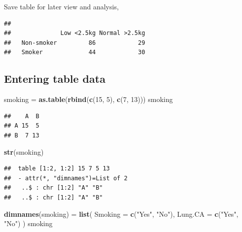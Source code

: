 \documentclass[]{book}
\newenvironment{Shaded}{\begin{snugshade}}{\end{snugshade}}
\newcommand{\KeywordTok}[1]{\textcolor[rgb]{0.13,0.29,0.53}{\textbf{#1}}}
\newcommand{\DataTypeTok}[1]{\textcolor[rgb]{0.13,0.29,0.53}{#1}}
\newcommand{\DecValTok}[1]{\textcolor[rgb]{0.00,0.00,0.81}{#1}}
\newcommand{\StringTok}[1]{\textcolor[rgb]{0.31,0.60,0.02}{#1}}
\newcommand{\OperatorTok}[1]{\textcolor[rgb]{0.81,0.36,0.00}{\textbf{#1}}}
\newcommand{\NormalTok}[1]{#1}
\theoremstyle{definition}
\theoremstyle{definition}
\theoremstyle{remark}
\begin{document}
Save table for later view and analysis,

\begin{Shaded}
\end{Shaded}

\begin{verbatim}
##             
##              Low <2.5kg Normal >2.5kg
##   Non-smoker         86            29
##   Smoker             44            30
\end{verbatim}

\subsection{Entering table data}\label{entering-table-data}

\begin{Shaded}
\begin{Highlighting}[]
\NormalTok{smoking =}\StringTok{ }\KeywordTok{as.table}\NormalTok{(}\KeywordTok{rbind}\NormalTok{(}\KeywordTok{c}\NormalTok{(}\DecValTok{15}\NormalTok{, }\DecValTok{5}\NormalTok{), }\KeywordTok{c}\NormalTok{(}\DecValTok{7}\NormalTok{, }\DecValTok{13}\NormalTok{)))}
\NormalTok{smoking}
\end{Highlighting}
\end{Shaded}

\begin{verbatim}
##    A  B
## A 15  5
## B  7 13
\end{verbatim}

\begin{Shaded}
\begin{Highlighting}[]
\KeywordTok{str}\NormalTok{(smoking)}
\end{Highlighting}
\end{Shaded}

\begin{verbatim}
##  table [1:2, 1:2] 15 7 5 13
##  - attr(*, "dimnames")=List of 2
##   ..$ : chr [1:2] "A" "B"
##   ..$ : chr [1:2] "A" "B"
\end{verbatim}

\begin{Shaded}
\begin{Highlighting}[]
\KeywordTok{dimnames}\NormalTok{(smoking) =}\StringTok{ }\KeywordTok{list}\NormalTok{(}
  \DataTypeTok{Smoking =} \KeywordTok{c}\NormalTok{(}\StringTok{"Yes"}\NormalTok{, }\StringTok{"No"}\NormalTok{),}
  \DataTypeTok{Lung.CA =} \KeywordTok{c}\NormalTok{(}\StringTok{"Yes"}\NormalTok{, }\StringTok{"No"}\NormalTok{)}
\NormalTok{)}
\NormalTok{smoking}
\end{Highlighting}
\end{Shaded}
\end{document}
